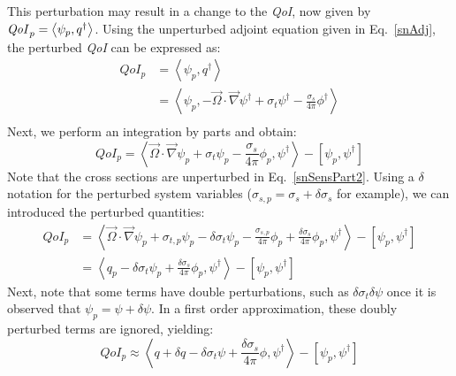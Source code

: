 \documentclass[12pt]{report}
\newcommand{\vO}{\vec{\Omega}}
\newcommand{\bra}{\left\langle}
\newcommand{\ket}{\right\rangle}
\newcommand{\sbra}{\left[}
\newcommand{\sket}{\right]}
\newcommand{\grad}{\vec{\nabla}}
\newcommand{\sigt}{\sigma_t}
\newcommand{\sigs}{\sigma_s}
\newcommand{\angResp}{q^\dag}
\newcommand{\qoi}{{\it QoI}\xspace}
\begin{document}
This perturbation may result in a change to the \qoi, now given by $\qoi_p=\bra \psi_p , \angResp \ket$. Using the unperturbed adjoint equation given in Eq.~\eqref{snAdj},
the perturbed \qoi can be expressed as:
\begin{equation}
\label{snSensPart}
\begin{split}
QoI_p &=\bra \psi_p , \angResp \ket \\
&=\bra \psi_p , - \vO \cdot \grad \psi^\dag + \sigt \psi^\dag - \frac{\sigs}{4 \pi} \phi^\dag  \ket \\
\end{split}
\end{equation}
Next, we perform an integration by parts and obtain:
\begin{equation}
\label{snSensPart2}
QoI_p = \bra  \vO \cdot \grad \psi_p + \sigt \psi_p - \frac{\sigs}{4 \pi} \phi_p , \psi^\dag  \ket - \sbra \psi_p, \psi^\dag \sket
\end{equation}
Note that the cross sections are unperturbed in Eq.~\eqref{snSensPart2}.
Using a $\delta$ notation for the perturbed system variables ($\sigma_{s,p} = \sigs + \delta \sigs$ for example), we
can introduced the perturbed quantities:
\begin{equation}
\label{snSensPart3}
\begin{split}
QoI_p &= \bra  \vO \cdot \grad \psi_p + \sigma_{t,p}\psi_p - \delta\sigt\psi_p - \frac{\sigma_{s,p}}{4 \pi} \phi_p
+\frac{\delta \sigs}{4 \pi} \phi_p
 , \psi^\dag  \ket - \sbra \psi_p, \psi^\dag \sket \\
 &= \bra  q_p - \delta\sigt\psi_p + \frac{\delta \sigs}{4 \pi} \phi_p
 , \psi^\dag  \ket - \sbra \psi_p, \psi^\dag \sket
\end{split}
\end{equation}
Next, note that some terms have double perturbations, such as $\delta \sigt \delta \psi$ once it is observed
that $\psi_p=\psi+\delta\psi$. 
In a first order approximation, these doubly perturbed terms are ignored, yielding:
\begin{equation}
\label{snAdjQoI}
QoI_p \approx \bra  q + \delta q - \delta\sigt\psi + \frac{\delta \sigs}{4 \pi} \phi
 , \psi^\dag  \ket - \sbra \psi_p, \psi^\dag \sket\end{equation}
\end{document}
